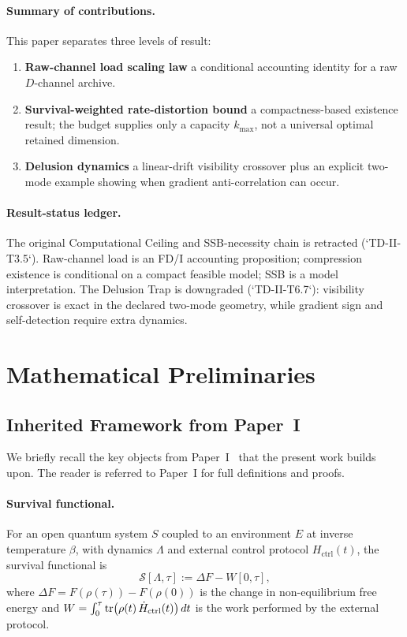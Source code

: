 \documentclass[12pt,a4paper,openany]{book}
\begin{document}
\paragraph{Summary of contributions.}
This paper separates three levels of result:
\begin{enumerate}
\item \textbf{Raw-channel load scaling law}
  a conditional accounting identity for a raw $D$-channel archive.
\item \textbf{Survival-weighted rate-distortion bound}
  a compactness-based existence result; the budget supplies only a
  capacity $k_{\max}$, not a universal optimal retained dimension.
\item \textbf{Delusion dynamics}
  a linear-drift visibility crossover plus an explicit two-mode
  example showing when gradient anti-correlation can occur.
\end{enumerate}

\paragraph{Result-status ledger.}
The original Computational Ceiling and SSB-necessity chain is retracted
(`TD-II-T3.5`).  Raw-channel load is an FD/I accounting proposition;
compression existence is conditional on a compact feasible model; SSB
is a model interpretation.  The Delusion Trap is downgraded
(`TD-II-T6.7`): visibility crossover is exact in the declared two-mode
geometry, while gradient sign and self-detection require extra dynamics.

\section{Mathematical Preliminaries}
\label{II-sec:prelim}

\subsection{Inherited Framework from Paper~I}
\label{II-subsec:inherited}

We briefly recall the key objects from
Paper~I~\cite{Liu2026TDOME_I} that the present work builds
upon.  The reader is referred to Paper~I for full definitions
and proofs.

\paragraph{Survival functional.}
For an open quantum system $S$ coupled to an environment $E$
at inverse temperature $\beta$, with dynamics $\Lambda$ and
external control protocol $H_{\mathrm{ctrl}}(t)$, the
survival functional is
\begin{equation}
\label{II-eq:survival_recall}
\mathcal{S}[\Lambda, \tau]
:= \Delta F - W[0,\tau],
\end{equation}
where $\Delta F = F(\rho(\tau)) - F(\rho(0))$ is the change
in non-equilibrium free energy and
$W = \int_0^\tau \tr(\rho(t)\,\dot{H}_{\mathrm{ctrl}}(t))\,dt$
is the work performed by the external protocol.
\end{document}
